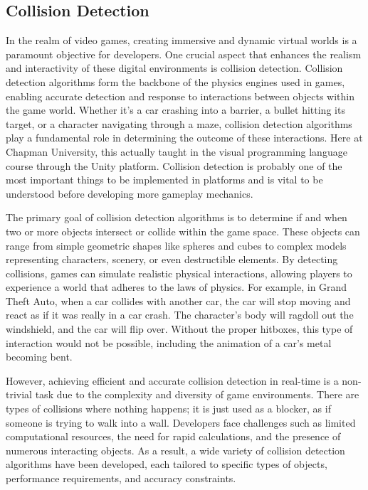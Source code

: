 \documentclass{article}
\theoremstyle{theorem}
\theoremstyle{definition}
\theoremstyle{remark}
\begin{document}
\subsection{Collision Detection}

\medskip\indent
In the realm of video games, creating immersive and dynamic virtual worlds is a paramount objective for developers. One crucial aspect that enhances the realism and interactivity of these digital environments is collision detection. Collision detection algorithms form the backbone of the physics engines used in games, enabling accurate detection and response to interactions between objects within the game world. Whether it's a car crashing into a barrier, a bullet hitting its target, or a character navigating through a maze, collision detection algorithms play a fundamental role in determining the outcome of these interactions. Here at Chapman University, this actually taught in the visual programming language course through the Unity platform. Collision detection is probably one of the most important things to be implemented in platforms and is vital to be understood before developing more gameplay mechanics.

\medskip\indent
The primary goal of collision detection algorithms is to determine if and when two or more objects intersect or collide within the game space. These objects can range from simple geometric shapes like spheres and cubes to complex models representing characters, scenery, or even destructible elements. By detecting collisions, games can simulate realistic physical interactions, allowing players to experience a world that adheres to the laws of physics.\cite{Aoa} For example, in Grand Theft Auto, when a car collides with another car, the car will stop moving and react as if it was really in a car crash. The character's body will ragdoll out the windshield, and the car will flip over. Without the proper hitboxes, this type of interaction would not be possible, including the animation of a car’s metal becoming bent.


\medskip\indent
However, achieving efficient and accurate collision detection in real-time is a non-trivial task due to the complexity and diversity of game environments. There are types of collisions where nothing happens; it is just used as a blocker, as if someone is trying to walk into a wall. Developers face challenges such as limited computational resources, the need for rapid calculations, and the presence of numerous interacting objects. As a result, a wide variety of collision detection algorithms have been developed, each tailored to specific types of objects, performance requirements, and accuracy constraints.
\end{document}
